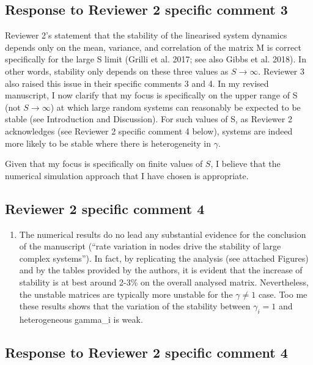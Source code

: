 \documentclass[]{article}
\providecommand{\tightlist}{%
  \setlength{\itemsep}{0pt}\setlength{\parskip}{0pt}}
\begin{document}
\subsection{Response to Reviewer 2 specific comment
3}\label{response-to-reviewer-2-specific-comment-3}

Reviewer 2's statement that the stability of the linearised system
dynamics depends only on the mean, variance, and correlation of the
matrix M is correct specifically for the large S limit (Grilli et al.
2017; see also Gibbs et al. 2018). In other words, stability only
depends on these three values as \(S \to \infty\). Reviewer 3 also
raised this issue in their specific comments 3 and 4. In my revised
manuscript, I now clarify that my focus is specifically on the upper
range of S (not \(S \to \infty\)) at which large random systems can
reasonably be expected to be stable (see Introduction and Discussion).
For such values of S, as Reviewer 2 acknowledges (see Reviewer 2
specific comment 4 below), systems are indeed more likely to be stable
where there is heterogeneity in \(\gamma\).

Given that my focus is specifically on finite values of \(S\), I believe
that the numerical simulation approach that I have chosen is
appropriate.

\subsection{Reviewer 2 specific comment
4}\label{reviewer-2-specific-comment-4}

\begin{enumerate}
\def\labelenumi{\arabic{enumi})}
\setcounter{enumi}{3}
\tightlist
\item
  The numerical results do no lead any substantial evidence for the
  conclusion of the manuscript (``rate variation in nodes drive the
  stability of large complex systems''). In fact, by replicating the
  analysis (see attached Figures) and by the tables provided by the
  authors, it is evident that the increase of stability is at best
  around 2-3\% on the overall analysed matrix. Nevertheless, the
  unstable matrices are typically more unstable for the
  \(\gamma \neq 1\) case. Too me these results shows that the variation
  of the stability between \(\gamma_i=1\) and heterogeneous gamma\_i is
  weak.
\end{enumerate}

\subsection{Response to Reviewer 2 specific comment
4}\label{response-to-reviewer-2-specific-comment-4}
\end{document}
